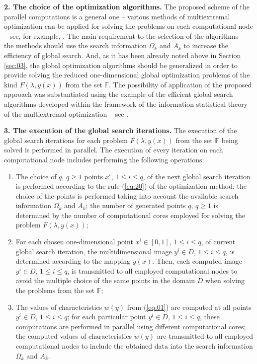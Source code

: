 \documentclass{svproc}
\begin{document}
\textbf{2. The choice of the optimization algorithms.} The proposed scheme of the parallel computations is a general one -- various methods of multiextremal optimization can be applied for solving the problems on each computational node -- see, for example, \cite{x18,x20,x29,x30,x31,x32,x33,x34,x35}. The main requirement to the selection of the algorithms -- the methods should use the search information $\Omega
_k$ and $A_k$ to increase the efficiency of global search. And, as it has been already noted above in Section \ref{sec:03}, the global optimization algorithms should be generalized in order to provide solving the reduced one-dimensional global optimization problems of the kind $F(\lambda,y(x))$ from the set $\mathbb{F}$. The possibility of application of the proposed approach was substantiated using the example of the efficient global search algorithms developed within the framework of the information-statistical theory of the multiextremal optimization -- see \cite{x12,x13,x14,x15,x16,x17,x18}.

\textbf{3. The execution of the global search iterations.} The execution of the global search iterations for each problem $F(\lambda,y(x))$ from the set $\mathbb{F}$ being solved is performed in parallel. The execution of every iteration on each computational node includes performing the following operations:
\begin{enumerate}
	\item The choice of $q$, $q \geq 1$ points $x^i$, $1\leq i\leq q$, of the next global search iteration is performed according to the rule (\ref{eq:20}) of the optimization method; the choice of the points is performed taking into account the available search information $\Omega_k$ and $A_k$; the number of generated points $q$, $q\geq 1$ is determined by the number of computational cores employed for solving the problem $F(\lambda,y(x))$;
	\item For each chosen one-dimensional point $x^i \in [0,1]$, $1 \leq i \leq q$, of current global search iteration, the multidimensional image $y^i \in D$, $1 \leq i \leq q$, is determined according to the mapping $y(x)$. Then, each computed image $y^i \in D$, $1 \leq i \leq q$, is transmitted to all employed computational nodes to avoid the multiple choice of the same points in the domain $D$ when solving the problems from the set $\mathbb{F}$;
	\item The values of characteristics $w(y)$ from (\ref{eq:01}) are computed at all points $y^i \in D$, $1 \leq i \leq q$; for each particular point $y^i \in D$, $1 \leq i \leq q$, these computations are performed in parallel using different computational cores; the computed values of characteristics $w(y)$ are transmitted to all employed computational nodes to include the obtained data into the search information $\Omega_k$ and $A_k$.
\end{enumerate}
\end{document}
